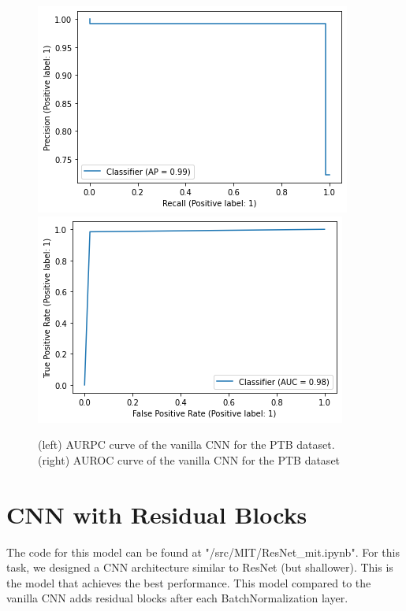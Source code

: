 \documentclass[11pt]{scrartcl}
\begin{document}
\begin{figure}[htp]
\centering
\includegraphics[width=.50\textwidth]{../models_performance_graphs/ptb/cnn_ptb_auprc.png}\hfill
\includegraphics[width=.50\textwidth]{../models_performance_graphs/ptb/cnn_ptb_auroc.png}\hfill
\caption{(left) AURPC curve of the vanilla CNN for the PTB dataset. \\ (right) AUROC curve of the vanilla CNN for the PTB dataset}
\label{fig:cnn_ptb_two}
\end{figure}



\section{CNN with Residual Blocks}
The code for this model can be found at "/src/MIT/ResNet\_mit.ipynb".
For this task, we designed a CNN architecture similar to ResNet (but shallower). This is the model that achieves the best performance. This model compared to the vanilla CNN adds residual blocks after each BatchNormalization layer.
\end{document}
